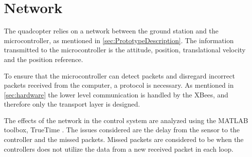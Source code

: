 \chapter{Network} \label{ch:Network}
The quadcopter relies on a network between the ground station and the microcontroller, as mentioned in \autoref{sec:PrototypeDescription}. The information transmitted to the microcontroller is the attitude, position, translational velocity and the position reference.

To ensure that the microcontroller can detect packets and disregard incorrect packets received from the computer, a protocol is necessary. As mentioned in \autoref{sec:hardware} the lower level communication is handled by the XBees, and therefore only the transport layer is designed.

The effects of the network in the control system are analyzed using the MATLAB toolbox, TrueTime \cite{TrueTimeNew}. The issues considered are the delay from the sensor to the controller and the missed packets. Missed packets are considered to be when the controllers does not utilize the data from a new received packet in each loop.